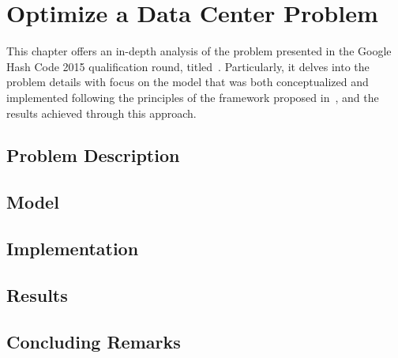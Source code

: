 \chapter{Optimize a Data Center Problem}
\label{ch:optimize-data-center}


This chapter offers an in-depth analysis of the problem presented in the Google
Hash Code 2015 qualification round,
titled~.
Particularly, it delves into the problem details with focus on the model that
was both conceptualized and implemented following the principles of the
framework proposed in~, and the results
achieved through this approach.


\section{Problem Description}
\label{sec:odc-problem}


\section{Model}
\label{sec:odc-model}


\section{Implementation}
\label{sec:odc-implementation}


\section{Results}
\label{sec:odc-results}


\section{Concluding Remarks}
\label{sec:odc-concluding-remarks}
